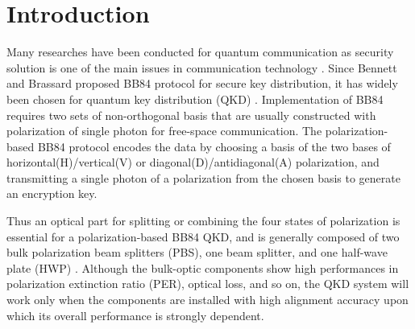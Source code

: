 \documentclass[letterpaper, 10pt]{article}
\begin{document}
\section{Introduction}
Many researches have been conducted for quantum communication as security solution is one of the main issues in communication technology \cite{Bennett:1984is, Ekert:1991kl,Ko:2017cs}.
Since Bennett and Brassard proposed BB84 protocol for secure key distribution, it has widely been chosen for quantum key distribution (QKD) \cite{Bennett:1984is}.
Implementation of BB84 requires two sets of non-orthogonal basis %
that are usually constructed with polarization of single photon for free-space communication.
The polarization-based BB84 protocol encodes the data by choosing a basis of the two bases of horizontal(H)/vertical(V) or diagonal(D)/antidiagonal(A) polarization, and transmitting a single photon of a polarization from the chosen basis to generate an encryption key.

Thus an optical part for splitting or combining the four states of polarization is essential for a polarization-based BB84 QKD, and is generally composed of two bulk polarization beam splitters (PBS), one beam splitter, and one half-wave plate (HWP) \cite{Ko:2017cs}.
Although the bulk-optic components show high performances in polarization extinction ratio (PER), optical loss, and so on, the QKD system will work only when the components are installed with high alignment accuracy upon which its overall performance is strongly dependent.
\end{document}
